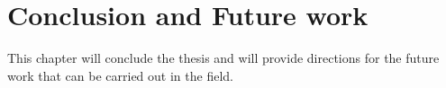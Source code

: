 \chapter{Conclusion and Future work}
This chapter will conclude the thesis and will provide directions for the future work that can be carried out in the field.

